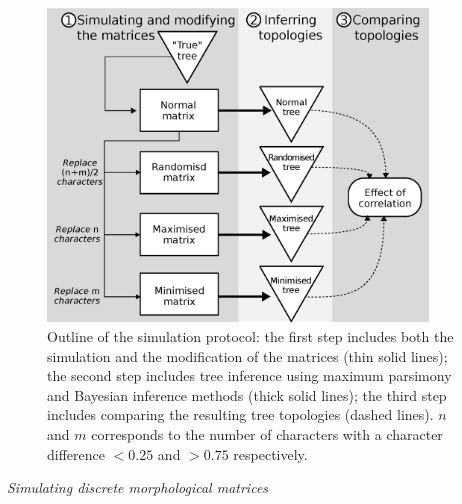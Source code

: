 \documentclass[12pt,letterpaper]{article}
\renewcommand{\subsection}[1]{%
\bigskip
\begin{center}
\begin{large}
\normalfont\itshape #1
\end{large}
\end{center}}
\begin{document}
\begin{figure}[!htbp]
\centering
   \includegraphics[width=0.9\textwidth]{outline.eps}
\caption{Outline of the simulation protocol: the first step includes both the simulation and the modification of the matrices (thin solid lines); the second step includes tree inference using maximum parsimony and Bayesian inference methods (thick solid lines); the third step includes comparing the resulting tree topologies (dashed lines). $n$ and $m$ corresponds to the number of characters with a character difference $<0.25$ and $>0.75$ respectively.}
\label{Fig:outline}
\end{figure}

\subsection{Simulating discrete morphological matrices}
\end{document}
